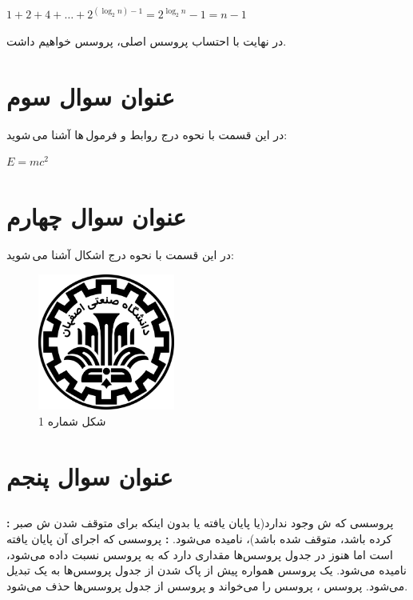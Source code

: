 \documentclass{article}
\begin{document}
\begin{center}
$
1+2+4+\ldots+2^{(\log_2 n)-1}=2^{\log_2 n}-1=n-1
$
\end{center}
در نهایت با احتساب پروسس  اصلی،  پروسس خواهیم داشت.

\section{عنوان سوال سوم}
در این قسمت با نحوه درج روابط و فرمول\,ها آشنا می\,شوید:
\begin{center}
$E = m{c}^{2}$
\end{center}

\section{عنوان سوال چهارم}
در این قسمت با نحوه درج اشکال آشنا می\,شوید:
\begin{figure}[H]
    \centering
    \includegraphics[width=0.4\textwidth]{IUT Logo.png}
    \caption{شکل شماره 1}
    \label{fig:fig1}
\end{figure}

\section{عنوان سوال پنجم}
\subsection{}
\textbf{:}
پروسسی که ش وجود ندارد(یا پایان یافته یا بدون اینکه برای متوقف شدن ش صبر کرده باشد، متوقف شده باشد)،  نامیده می‌شود.
\newline
\textbf{:}
پروسسی که اجرای آن پایان یافته است اما هنوز در جدول پروسس‌ها مقداری دارد که به پروسس  نسبت داده می‌شود،  نامیده می‌شود. یک پروسس  همواره پیش از پاک شدن از جدول پروسس‌ها به یک  تبدیل می‌شود. پروسس ،  پروسس  را می‌خواند و پروسس  از جدول پروسس‌ها حذف می‌شود.
\end{document}
